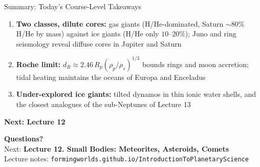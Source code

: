 \documentclass[aspectratio=169, 11pt]{beamer}
\begin{document}
\begin{frame}{Summary: Today's Course-Level Takeaways}
  \begin{enumerate}\setlength\itemsep{6pt}
    \item \textbf{Two classes, dilute cores:} gas giants (H/He-dominated, Saturn $\sim 80\%$ H/He by mass) against ice giants (H/He only $10$--$20\%$); Juno and ring seismology reveal diffuse cores in Jupiter and Saturn
    \item \textbf{Roche limit:} $d_R \approx 2.46\,R_p(\rho_p/\rho_s)^{1/3}$ bounds rings and moon accretion; tidal heating maintains the oceans of Europa and Enceladus
    \item \textbf{Under-explored ice giants:} tilted dynamos in thin ionic water shells, and the closest analogues of the sub-Neptunes of Lecture 13
  \end{enumerate}
  \vskip8pt
  \textbf{Next: Lecture 12}
\end{frame}

\begin{frame}
  \vfill
  \begin{center}
    {\color{white}\Huge \textbf{Questions?}}\\[14pt]
    {\color{white}\large Next: \textbf{Lecture 12. Small Bodies: Meteorites, Asteroids, Comets}}\\[10pt]
    {\color{white}\normalsize Lecture notes: \texttt{formingworlds.github.io/IntroductionToPlanetaryScience}}
  \end{center}
  \vfill
\end{frame}
\end{document}
